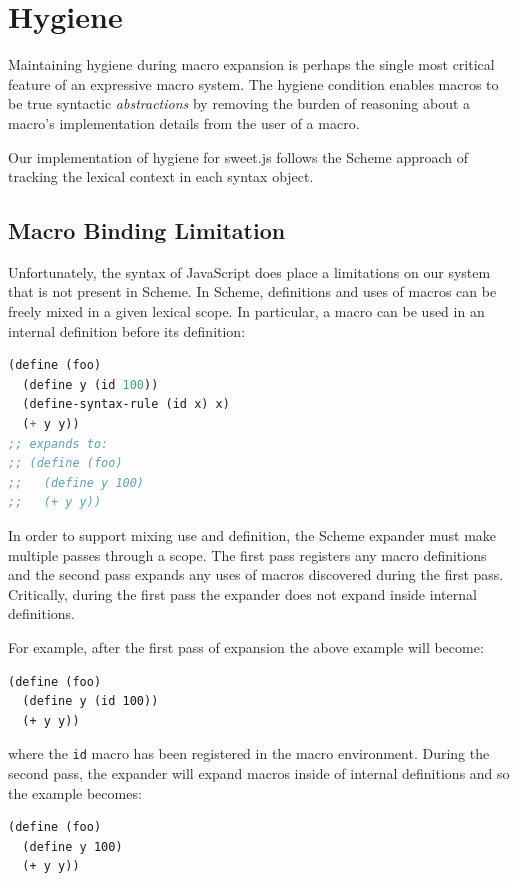 \documentclass[preprint,10pt]{sigplanconf}
\begin{document}

\section{Hygiene}
\label{sec:hygiene}

Maintaining hygiene during macro expansion is perhaps the single most
critical feature of an expressive macro system. The hygiene condition
enables macros to be true syntactic \emph{abstractions} by removing
the burden of reasoning about a macro's implementation details from the
user of a macro.

Our implementation of hygiene for sweet.js follows the Scheme approach
\cite{Hieb1992,Flatt2012} of tracking the lexical context in each
syntax object.

\subsection{Macro Binding Limitation} 
\label{sec:macroBinding}

Unfortunately, the syntax of JavaScript does place a limitations on
our system that is not present in Scheme. In Scheme, definitions and
uses of macros can be freely mixed in a given lexical scope. In
particular, a macro can be used in an internal definition before its definition:

\begin{lstlisting}[language=lisp]
(define (foo)
  (define y (id 100))
  (define-syntax-rule (id x) x)
  (+ y y))
;; expands to:
;; (define (foo)
;;   (define y 100)
;;   (+ y y))
\end{lstlisting}

In order to support mixing use and definition, the Scheme expander
must make multiple passes through a scope. The first pass registers
any macro definitions and the second pass expands any uses of macros
discovered during the first pass. Critically, during the first
pass the expander does not expand inside internal definitions.

For example, after the first pass of expansion the above example will become:
\begin{lstlisting}
(define (foo)
  (define y (id 100))
  (+ y y))
\end{lstlisting}
where the \verb!id! macro has been registered in the macro
environment. During the second pass, the expander will expand macros
inside of internal definitions and so the example becomes:
\begin{lstlisting}
(define (foo)
  (define y 100)
  (+ y y))
\end{lstlisting}
\end{document}
